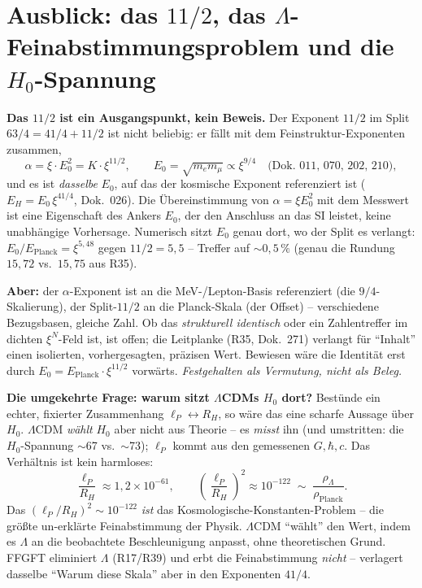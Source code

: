 \section{Ausblick: das $11/2$, das $\Lambda$-Feinabstimmungsproblem und die $H_0$-Spannung}

\textbf{Das $11/2$ ist ein Ausgangspunkt, kein Beweis.} Der Exponent $11/2$ im
Split $63/4 = 41/4 + 11/2$ ist nicht beliebig: er fällt mit dem
Feinstruktur-Exponenten zusammen,
\begin{equation}
  \alpha = \xi\cdot E_0^2 = K\cdot\xi^{11/2},\qquad E_0=\sqrt{m_e m_\mu}\propto\xi^{9/4}
  \quad\text{(Dok.~011, 070, 202, 210)},
\end{equation}
und es ist \emph{dasselbe} $E_0$, auf das der kosmische Exponent referenziert
ist ($E_H=E_0\,\xi^{41/4}$, Dok.~026). Die Übereinstimmung von $\alpha=\xi E_0^2$
mit dem Messwert ist eine Eigenschaft des Ankers $E_0$, der den Anschluss an das
SI leistet, keine unabhängige Vorhersage. Numerisch sitzt $E_0$ genau dort, wo der
Split es verlangt: $E_0/E_\text{Planck}=\xi^{5{,}48}$ gegen $11/2=5{,}5$ --
Treffer auf $\sim0{,}5\,\%$ (genau die Rundung $15{,}72$ vs.\ $15{,}75$ aus
R35).

\textbf{Aber:} der $\alpha$-Exponent ist an die MeV-/Lepton-Basis referenziert
(die $9/4$-Skalierung), der Split-$11/2$ an die Planck-Skala (der Offset) --
verschiedene Bezugsbasen, gleiche Zahl. Ob das \emph{strukturell identisch} oder
ein Zahlentreffer im dichten $\xi^N$-Feld ist, ist offen; die Leitplanke (R35,
Dok.~271) verlangt für \enquote{Inhalt} einen isolierten, vorhergesagten,
präzisen Wert. Bewiesen wäre die Identität erst durch
$E_0 = E_\text{Planck}\cdot\xi^{11/2}$ vorwärts. \emph{Festgehalten als
Vermutung, nicht als Beleg.}

\textbf{Die umgekehrte Frage: warum sitzt $\Lambda$CDMs $H_0$ dort?} Bestünde
ein echter, fixierter Zusammenhang $\ell_P\leftrightarrow R_H$, so wäre das eine
scharfe Aussage über $H_0$. $\Lambda$CDM \emph{wählt} $H_0$ aber nicht aus
Theorie -- es \emph{misst} ihn (und umstritten: die $H_0$-Spannung $\sim$67
vs.\ $\sim$73); $\ell_P$ kommt aus den gemessenen $G,\hbar,c$. Das Verhältnis
ist kein harmloses:
\begin{equation}
  \frac{\ell_P}{R_H}\approx 1{,}2\times10^{-61},
  \qquad
  \left(\frac{\ell_P}{R_H}\right)^2\approx10^{-122}
  \;\sim\;\frac{\rho_\Lambda}{\rho_\text{Planck}}.
\end{equation}
Das $(\ell_P/R_H)^2\sim10^{-122}$ \emph{ist} das Kosmologische-Konstanten-Problem
-- die größte un-erklärte Feinabstimmung der Physik. $\Lambda$CDM
\enquote{wählt} den Wert, indem es $\Lambda$ an die beobachtete Beschleunigung
anpasst, ohne theoretischen Grund. FFGFT eliminiert $\Lambda$ (R17/R39) und
erbt die Feinabstimmung \emph{nicht} -- verlagert dasselbe \enquote{Warum diese
Skala} aber in den Exponenten $41/4$.

